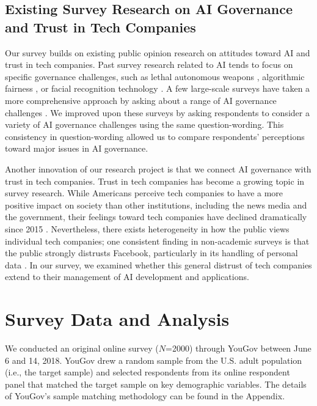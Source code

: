 \documentclass{article}
\begin{document}
\subsection{Existing Survey Research on AI Governance and Trust in Tech Companies}

Our survey builds on existing public opinion research on attitudes toward AI and trust in tech companies. Past survey research related to AI tends to focus on specific governance challenges, such as lethal autonomous weapons \citep{horowitz2016public}, algorithmic fairness \citep{saxena2019fairness}, or facial recognition technology \citep{smith2019facial,facevalue2019}. A few large-scale surveys have taken a more comprehensive approach by asking about a range of AI governance challenges \citep{eurobarometer460,smith2017,cave2019scary}. We improved upon these surveys by asking respondents to consider a variety of AI governance challenges using the same question-wording. This consistency in question-wording allowed us to compare respondents' perceptions toward major issues in AI governance. 

Another innovation of our research project is that we connect AI governance with trust in tech companies. Trust in tech companies has become a growing topic in survey research. While Americans perceive tech companies to have a more positive impact on society than other institutions, including the news media and the government, their feelings toward tech companies have declined dramatically since 2015 \citep{doherty2019americans}. Nevertheless, there exists heterogeneity in how the public views individual tech companies; one consistent finding in non-academic surveys is that the public strongly distrusts Facebook, particularly in its handling of personal data \citep{newton2017verge,molla2018facebook,kahn2018americans}. In our survey, we examined whether this general distrust of tech companies extend to their management of AI development and applications. 

\section{Survey Data and Analysis}

We conducted an original online survey ($N$=2000) through YouGov between June 6 and 14, 2018. YouGov drew a random sample from the U.S. adult population (i.e., the target sample) and selected respondents from its online respondent panel that matched the target sample on key demographic variables. The details of YouGov's sample matching methodology can be found in the Appendix. 
\end{document}
